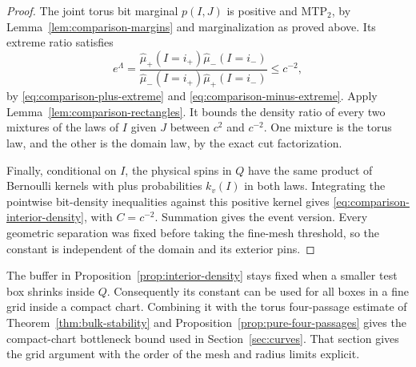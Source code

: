 \begin{proof}
The joint torus bit marginal \(p(I,J)\) is positive and MTP\(_2\), by
Lemma~\ref{lem:comparison-margins} and marginalization as proved above.
Its extreme ratio satisfies
\[
 e^{\Lambda}
 =\frac{\widehat\mu_+(I=i_+)\widehat\mu_-(I=i_-)}
        {\widehat\mu_-(I=i_+)\widehat\mu_+(I=i_-)}
 \le c^{-2},
\]
by \eqref{eq:comparison-plus-extreme} and
\eqref{eq:comparison-minus-extreme}.  Apply
Lemma~\ref{lem:comparison-rectangles}.  It bounds the density ratio of
every two mixtures of the laws of \(I\) given \(J\) between \(c^2\)
and \(c^{-2}\).  One mixture is the torus law, and the other is the
domain law, by the exact cut factorization.

Finally, conditional on \(I\), the physical spins in \(Q\) have the
same product of Bernoulli kernels with plus probabilities \(k_v(I)\)
in both laws.  Integrating the pointwise bit-density inequalities
against this positive kernel gives
\eqref{eq:comparison-interior-density}, with \(C=c^{-2}\).
Summation gives the event version.  Every geometric separation was
fixed before taking the fine-mesh threshold, so the constant is
independent of the domain and its exterior pins.
\end{proof}

The buffer in Proposition~\ref{prop:interior-density} stays fixed when a
smaller test box shrinks inside \(Q\).  Consequently its constant can
be used for all boxes in a fine grid inside a compact chart.  Combining
it with the torus four-passage estimate of
Theorem~\ref{thm:bulk-stability} and
Proposition~\ref{prop:pure-four-passages} gives the compact-chart
bottleneck bound used in Section~\ref{sec:curves}.  That section gives
the grid argument with the order of the mesh and radius limits explicit.
